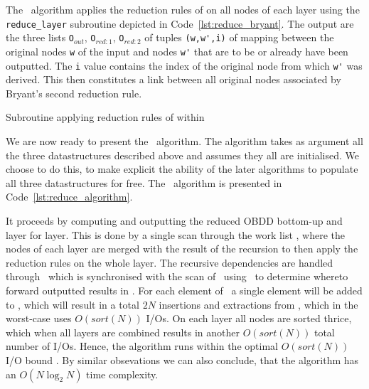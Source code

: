 The \Reduce\ algorithm applies the reduction rules of \textcite[Definition
5]{Bryant86} on all nodes of each layer using the \lstinline{reduce_layer}
subroutine depicted in Code~\ref{lst:reduce_bryant}. The output are the three
lists \lstinline{O}$_{\mathit{out}}$, \lstinline{O}$_{\mathit{red:}1}$,
\lstinline{O}$_{\mathit{red:}2}$ of tuples \lstinline{(w,w',i)} of mapping
between the original nodes \lstinline{w} of the input and nodes \lstinline{w'}
that are to be or already have been outputted. The \lstinline{i} value contains
the index of the original node from which \lstinline{w'} was derived. This then
constitutes a link between all original nodes associated by Bryant's second
reduction rule.

\begin{lstfloat}[ht!]
  \centering

  

  \caption{Subroutine applying reduction rules of \cite{Bryant86} within \Reduce}
  \label{lst:reduce_bryant}
\end{lstfloat}

\newpage
We are now ready to present the \Reduce\ algorithm. The algorithm takes as
argument all the three datastructures described above and assumes they all are
initialised. We choose to do this, to make explicit the ability of the later
algorithms to populate all three datastructures for free. The \Reduce\ algorithm
is presented in Code~\ref{lst:reduce_algorithm}.

It proceeds by computing and outputting the reduced OBDD bottom-up and layer for
layer. This is done by a single scan through the work list \ReduceLwork, where
the nodes of each layer are merged with the result of the recursion to then
apply the reduction rules on the whole layer. The recursive dependencies are
handled through \ReduceQdep\ which is synchronised with the scan of
\ReduceLwork\ using \ReduceLdep\ to determine whereto forward outputted results
in \ReduceQdep.
For each element of \ReduceLdep\ a single element will be added to \ReduceQdep,
which will result in a total $2 N$ insertions and extractions from \ReduceQdep,
which in the worst-case uses $O(sort(N))$ I/Os. On each layer all nodes are
sorted thrice, which when all layers are combined results in another
$O(sort(N))$ total number of I/Os. Hence, the algorithm runs within the optimal
$O(sort(N))$ I/O bound \cite{Arge96}. By similar obsevations we can also
conclude, that the algorithm has an $O(N \log_2 N)$ time complexity.


